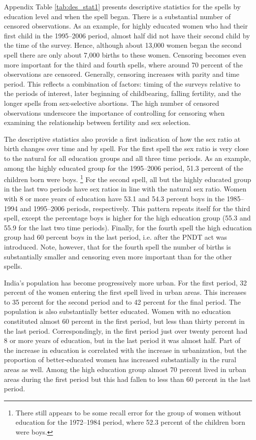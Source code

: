 \documentclass[12pt,letterpaper]{article}
\begin{document}
Appendix Table \ref{tab:des_stat1} presents descriptive statistics for
the spells by education level and when the spell began.
There is a substantial number of censored observations.
As an example, for highly educated women who had their first child in the 1995--2006
period, almost half did not have their second child by the time of the survey.
Hence, although about 13,000 women began the second spell 
there are only about 7,000 births to these women.
Censoring becomes even more important for the third and fourth
spells, where around 70 percent of the observations are censored.
Generally, censoring increases with parity and time period.
This reflects a combination of factors: timing of the surveys
relative to the periods of interest, later beginning of childbearing, 
falling fertility, and the longer spells from sex-selective abortions.
The high number of censored observations underscore the importance of controlling for
censoring when examining the relationship between fertility and sex selection.

The descriptive statistics also provide a first indication of how the
sex ratio at birth changes over time and by spell.
For the first spell the sex ratio is very close to the natural
for all education groups and all three time periods.
As an example, among the highly educated group for the 1995--2006 period,
51.3 percent of the children born were boys.%
\footnote{
There still appears to be some recall error for the group of women without
education for the 1972--1984 period, where 52.3 percent of the children born were boys.
}
For the second spell, all but the highly educated group in the last two
periods have sex ratios in line with the natural sex ratio.
Women with 8 or more years of education have 53.1 and 54.3 percent
boys in the 1985--1994 and 1995--2006 periods, respectively.
This pattern repeats itself for the third spell, except the percentage
boys is higher for the high education group (55.3 and 55.9 for the last
two time periods).
Finally, for the fourth spell the high education group 
had 60 percent boys in the last period, i.e. after the PNDT act was introduced.
Note, however, that for the fourth spell the number of births is substantially
smaller and censoring even more important than for the other spells.

India's population has become progressively more urban.
For the first period, 32 percent of the women entering the first spell lived in urban areas.
This increases to 35 percent for the second period and to 42 percent for the final period.
The population is also substantially better educated.
Women with no education constituted almost 60 percent 
in the first period, but less than thirty percent in the last period.
Correspondingly, in the first period just over twenty percent had 8 or more 
years of education, but in the last period it was almost half.
Part of the increase in education is correlated with the increase in urbanization,
but the proportion of better-educated women has increased substantially
in the rural areas as well.
Among the high education group almost 70 percent lived in urban areas
during the first period but this had fallen to less than 60 percent
in the last period.
\end{document}
